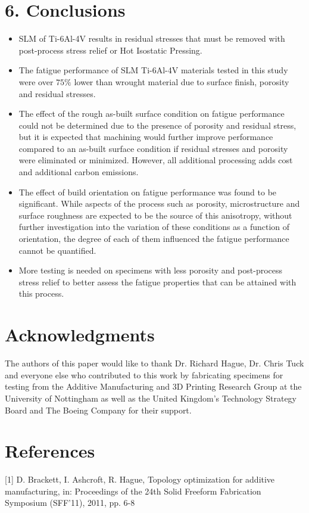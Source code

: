 \documentclass[10pt]{article}
\begin{document}
\section*{6. Conclusions}
\begin{itemize}
  \item SLM of Ti-6Al-4V results in residual stresses that must be removed with post-process stress relief or Hot Isostatic Pressing.
  \item The fatigue performance of SLM Ti-6Al-4V materials tested in this study were over $75 \%$ lower than wrought material due to surface finish, porosity and residual stresses.
  \item The effect of the rough as-built surface condition on fatigue performance could not be determined due to the presence of porosity and residual stress, but it is expected that machining would further improve performance compared to an as-built surface condition if residual stresses and porosity were eliminated or minimized. However, all additional processing adds cost and additional carbon emissions.
  \item The effect of build orientation on fatigue performance was found to be significant. While aspects of the process such as porosity, microstructure and surface roughness are expected to be the source of this anisotropy, without further investigation into the variation of these conditions as a function of orientation, the degree of each of them influenced the fatigue performance cannot be quantified.
  \item More testing is needed on specimens with less porosity and post-process stress relief to better assess the fatigue properties that can be attained with this process.
\end{itemize}

\section*{Acknowledgments}
The authors of this paper would like to thank Dr. Richard Hague, Dr. Chris Tuck and everyone else who contributed to this work by fabricating specimens for testing from the Additive Manufacturing and 3D Printing Research Group at the University of Nottingham as well as the United Kingdom's Technology Strategy Board and The Boeing Company for their support.

\section*{References}
[1] D. Brackett, I. Ashcroft, R. Hague, Topology optimization for additive manufacturing, in: Proceedings of the 24th Solid Freeform Fabrication Symposium (SFF'11), 2011, pp. 6-8
\end{document}
